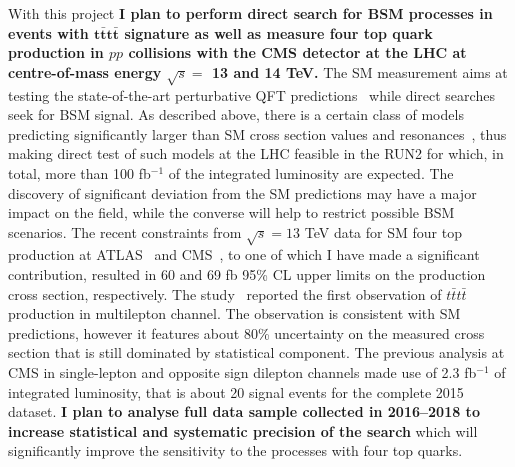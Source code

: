 \textcolor{\mycolor}{
With this project \textbf{I plan to perform direct search for BSM processes in events with $\pmb{t\bar{t}t\bar{t}}$ signature  as well as measure four top quark production in $pp$ collisions with the CMS detector at the LHC at centre-of-mass energy $\sqrt{s}=$ 13 and 14 TeV.} The SM measurement aims at testing the state-of-the-art perturbative QFT predictions~\cite{Bevilacqua:2012em,Frederix:2017wme} while direct searches seek for BSM signal. As described above, there is a certain class of models predicting significantly larger than SM cross section values and resonances~\cite{Lillie:2007hd, Gregoire:2011ka, Pomarol:2008bh}, thus making direct test of such models at the LHC feasible in the RUN2 for which, in total, more than 100 fb$^{-1}$ of the integrated luminosity are expected. The discovery of significant deviation from the SM predictions may have a major impact on the field, while the converse will help to restrict possible BSM scenarios. The recent constraints from $\sqrt{s}=13$ TeV data for SM four top production at ATLAS~\cite{Aaboud:2017faq} and CMS~\cite{Sirunyan:2017tep}, to one of which I have made a significant contribution,
resulted in 60 and 69 fb 95\% CL upper limits on the production cross section, respectively. The study~\cite{Sirunyan:2017roi} reported the first observation of $t\bar{t}t\bar{t}$ production in multilepton channel. The observation is consistent with SM predictions, however it features about 80\% uncertainty on the measured cross section that is still dominated by statistical component.
}
\textcolor{\mycolor}{
The previous analysis at CMS in single-lepton and opposite sign dilepton channels made use of 2.3 fb$^{-1}$ of integrated luminosity, that is about 20 signal events for the complete 2015 dataset. \textbf{I plan to analyse full data sample collected in 2016--2018 to increase statistical and systematic precision of the search} which will significantly improve the sensitivity to the processes with four top quarks. }


